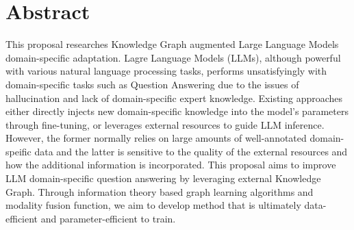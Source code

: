 \section*{Abstract}
This proposal researches Knowledge Graph augmented Large Language Models domain-specific adaptation. 
Lagre Language Models (LLMs), although powerful with various natural language processing tasks, performs unsatisfyingly with domain-specific tasks such as Question Answering due to the issues of hallucination and lack of domain-specific expert knowledge. 
Existing approaches either directly injects new domain-specific knowledge into the model's parameters through fine-tuning, or leverages external resources to guide LLM inference. 
However, the former normally relies on large amounts of well-annotated domain-speific data and the latter is sensitive to the quality of the external resources and how the additional information is incorporated. 
This proposal aims to improve LLM domain-specific question answering by leveraging external Knowledge Graph.
Through information theory based graph learning algorithms and modality fusion function, we aim to develop method that is ultimately data-efficient and parameter-efficient to train. 
